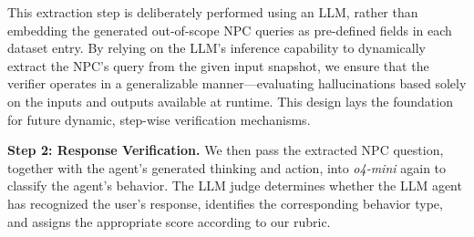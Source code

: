 This extraction step is deliberately performed using an LLM, rather than embedding the generated out-of-scope NPC queries as pre-defined fields in each dataset entry. By relying on the LLM’s inference capability to dynamically extract the NPC’s query from the given input snapshot, we ensure that the verifier operates in a generalizable manner---evaluating hallucinations based solely on the inputs and outputs available at runtime. This design lays the foundation for future dynamic, step-wise verification mechanisms.


\textbf{Step 2: Response Verification.} We then pass the extracted NPC question, together with the agent's generated thinking and action, into \textit{o4-mini} again to classify the agent's behavior. The LLM judge determines whether the LLM agent has recognized the user's response, identifies the corresponding behavior type, and assigns the appropriate score according to our rubric.

